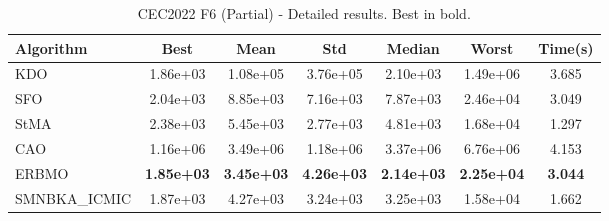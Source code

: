 \begin{table}[H]
\centering\small
\caption{CEC2022 F6 (Partial) - Detailed results. Best in bold.}
\label{tab:cec2022_F6}
\begin{tabular}{lcccccc}
\toprule
\textbf{Algorithm} & \textbf{Best} & \textbf{Mean} & \textbf{Std} & \textbf{Median} & \textbf{Worst} & \textbf{Time(s)} \\
\midrule
KDO & 1.86e+03 & 1.08e+05 & 3.76e+05 & 2.10e+03 & 1.49e+06 & 3.685 \\
SFO & 2.04e+03 & 8.85e+03 & 7.16e+03 & 7.87e+03 & 2.46e+04 & 3.049 \\
StMA & 2.38e+03 & 5.45e+03 & 2.77e+03 & 4.81e+03 & 1.68e+04 & 1.297 \\
CAO & 1.16e+06 & 3.49e+06 & 1.18e+06 & 3.37e+06 & 6.76e+06 & 4.153 \\
ERBMO & \textbf{1.85e+03} & \textbf{3.45e+03} & \textbf{4.26e+03} & \textbf{2.14e+03} & \textbf{2.25e+04} & \textbf{3.044} \\
SMNBKA_ICMIC & 1.87e+03 & 4.27e+03 & 3.24e+03 & 3.25e+03 & 1.58e+04 & 1.662 \\
\bottomrule
\end{tabular}
\end{table}
